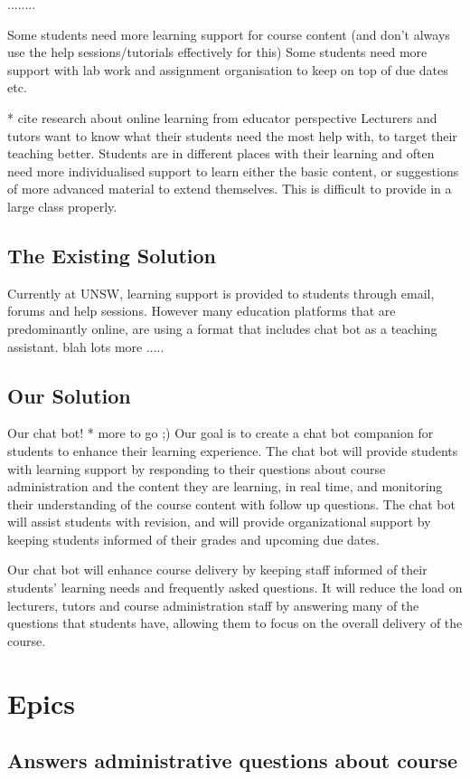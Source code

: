 \documentclass{article}
\begin{document}
........ 

Some students need more learning support for course content (and don't always use the help sessions/tutorials effectively for this)
Some students need more support with lab work and assignment organisation to keep on top of due dates etc. 

* cite research about online learning from educator perspective
Lecturers and tutors want to know what their students need the most help with, to target their teaching better. Students are in different 
places with their learning and often need more individualised support to learn either the basic content, or suggestions of more advanced 
material to extend themselves. This is difficult to provide in a large class properly.

\subsection{The Existing Solution}
Currently at UNSW, learning support is provided to students through email, forums and help sessions. However many education
platforms that are predominantly online, are using a format that includes chat bot as a teaching assistant.
blah lots more .....

\subsection{Our Solution}
Our chat bot! * more to go ;)
Our goal is to create a chat bot companion for students to enhance their learning experience. The chat bot will provide students with learning support 
by responding to their questions about course administration and the content they are learning, in real time, and monitoring their understanding of the
course content with follow up questions. The chat bot will assist students with revision, and will provide organizational support by keeping students 
informed of their grades and upcoming due dates.

Our chat bot will enhance course delivery by keeping staff informed of their students' learning needs and frequently asked questions. It will reduce the 
load on lecturers, tutors and course administration staff by answering many of the questions that students have, allowing them to focus on the overall
delivery of the course. 


\section{Epics}
\subsection{Answers administrative questions about course}
\end{document}
